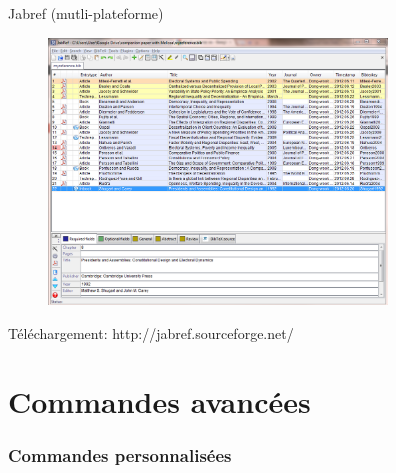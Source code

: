 \documentclass{beamer}
\begin{document}
\begin{frame}{Jabref (mutli-plateforme)}

\vspace*{-0.5cm}
\begin{figure} %
\centering %
\includegraphics[width=9cm]{img/jabref} %
\end{figure} %

\vspace*{-0.5cm}
{\footnotesize Téléchargement: http://jabref.sourceforge.net/ }

\end{frame}




\part{Commandes avancées}

\section{Commandes personnalisées}
\end{document}
